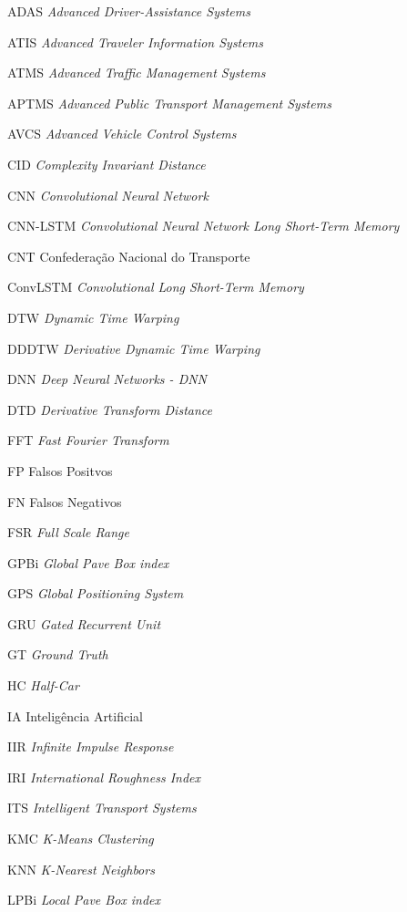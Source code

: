 \begin{siglas}
\item[ADAS] \textit{Advanced Driver-Assistance Systems}
\item[ATIS] \textit{Advanced Traveler Information Systems}
\item[ATMS] \textit{Advanced Traffic Management Systems}
\item[APTMS] \textit{Advanced Public Transport Management Systems}
\item[AVCS] \textit{Advanced Vehicle Control Systems}
\item[CID] \textit{Complexity Invariant Distance}
\item[CNN] \textit{Convolutional Neural Network}
\item[CNN-LSTM] \textit{Convolutional Neural Network Long Short-Term Memory}
\item[CNT] Confederação Nacional do Transporte
\item[ConvLSTM] \textit{Convolutional Long Short-Term Memory}
\item[DTW] \textit{Dynamic Time Warping}
\item[DDDTW] \textit{Derivative Dynamic Time Warping}
\item[DNN] \textit{Deep Neural Networks - DNN}
\item[DTD] \textit{Derivative Transform Distance}
\item[FFT] \textit{Fast Fourier Transform}
\item[FP] Falsos Positvos
\item[FN] Falsos Negativos
\item[FSR] \textit{Full Scale Range}
\item[GPBi] \textit{Global Pave Box index}
\item[GPS] \textit{Global Positioning System}
\item[GRU] \textit{Gated Recurrent Unit}
\item[GT] \textit{Ground Truth}
\item[HC] \textit{Half-Car}
\item[IA] Inteligência  Artificial
\item[IIR] \textit{Infinite Impulse Response}
\item[IRI] \textit{International Roughness Index}
\item[ITS] \textit{Intelligent Transport Systems}
\item[KMC] \textit{K-Means Clustering}
\item[KNN] \textit{K-Nearest Neighbors}
\item[LPBi] \textit{Local Pave Box index}

\end{siglas}
